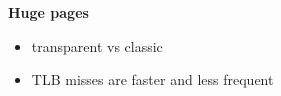 \documentclass[usenames,dvipsnames, 18pt, compress, aspectratio=169]{beamer}
\begin{document}





\begin{frame}[fragile]{}
    \frametitle{}
    \begin{center}
        \textbf{Huge pages}

        \begin{itemize}[]
            \item transparent vs classic
			\item TLB misses are faster and less frequent
        \end{itemize}

    \end{center}
\end{frame}
\end{document}
